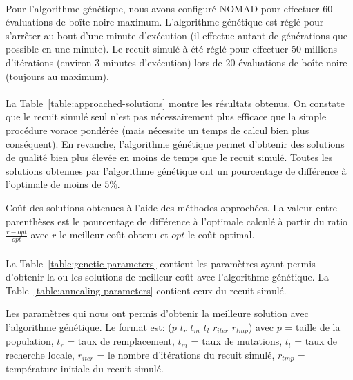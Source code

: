 \documentclass[12pt,letterpaper,twoside]{article}
\begin{document}
			\paragraph*{}
				Pour l'algorithme génétique, nous avons configuré NOMAD pour effectuer 60 évaluations de boîte noire maximum.
				L'algorithme génétique est réglé pour s'arrêter au bout d'une minute d'exécution (il effectue autant de générations
				que possible en une minute).
				Le recuit simulé à été réglé pour effectuer 50 millions d'itérations (environ 3 minutes d'exécution) lors de 20 évaluations de boîte noire (toujours au maximum).

			\paragraph*{}
				La Table~\ref{table:approached-solutions} montre les résultats obtenus.
				On constate que le recuit simulé seul n'est pas nécessairement plus efficace que la simple procédure vorace pondérée (mais nécessite un temps
				de calcul bien plus conséquent). En revanche, l'algorithme génétique permet d'obtenir des solutions de qualité bien plus élevée en moins de temps que
				le recuit simulé. Toutes les solutions obtenues par l'algorithme génétique ont un pourcentage de différence à l'optimale de moins de \(5\%\).

			\begin{table}[H]
				\centering
				
				\caption{Coût des solutions obtenues à l'aide des méthodes approchées. La valeur entre parenthèses est le pourcentage de différence à l'optimale calculé
					à partir du ratio \(\frac{r-opt}{opt}\) avec \(r\) le meilleur coût obtenu et \(opt\) le coût optimal.}
				\label{table:approached-solutions}
			\end{table}

			\paragraph*{}
				La Table~\ref{table:genetic-parameters} contient les paramètres ayant permis d'obtenir la ou les solutions de meilleur coût avec l'algorithme génétique.
				La Table~\ref{table:annealing-parameters} contient ceux du recuit simulé.

			\begin{table}[H]
				\centering
				\footnotesize
				
				\caption{Les paramètres qui nous ont permis d'obtenir la meilleure solution avec l'algorithme génétique.
					Le format est: (\(p\) \(t_r\) \(t_m\) \(t_l\) \(r_{iter}\) \(r_{tmp}\)) avec \(p\) = taille de la population,
					\(t_r\) = taux de remplacement, \(t_m\) = taux de mutations, \(t_l\) = taux de recherche locale, \(r_{iter}\) =
					le nombre d'itérations du recuit simulé, \(r_{tmp}\) = température initiale du recuit simulé.}
				\label{table:genetic-parameters}
			\end{table}
\end{document}
